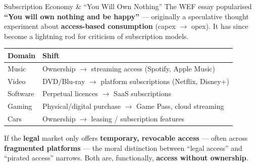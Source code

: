 \documentclass[aspectratio=169,11pt]{beamer}
\begin{document}
	\begin{frame}{Subscription Economy \& ``You Will Own Nothing''}
		\vspace{0.1cm}
		{\small The WEF essay popularised \textbf{``You will own nothing and be happy''} --- originally a speculative thought experiment about \textbf{access-based consumption} (capex $\rightarrow$ opex). It has since become a lightning rod for criticism of subscription models.}
		\vspace{0.35cm}
		\centering
		\begin{tabular}{@{}l l@{}}
			\toprule
			\textbf{\color{ctpMauve}Domain} & \textbf{\color{ctpMauve}Shift} \\
			\midrule
			Music      & Ownership $\rightarrow$ streaming access (Spotify, Apple Music) \\
			Video      & DVD/Blu-ray $\rightarrow$ platform subscriptions (Netflix, Disney+) \\
			Software   & Perpetual licences $\rightarrow$ SaaS subscriptions \\
			Gaming     & Physical/digital purchase $\rightarrow$ Game Pass, cloud streaming \\
			Cars       & Ownership $\rightarrow$ leasing / subscription features \\
			\bottomrule
		\end{tabular}
		\vspace{0.35cm}
		\begin{warningbox}
			\small If the \textbf{legal} market only offers \textbf{temporary, revocable access} --- often across \textbf{fragmented platforms} --- the moral distinction between ``legal access'' and ``pirated access'' narrows. Both are, functionally, \textbf{access without ownership}.
		\end{warningbox}
	\end{frame}
	
\end{document}

